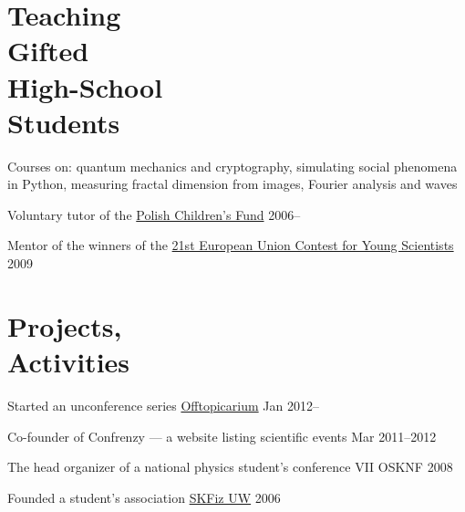 \documentclass[margin,line]{resume}
\begin{document}
\begin{resume}


    \section{\mysidestyle Teaching\\Gifted\\High-School\\Students}
    \begin{list2}
        \item Courses on: quantum mechanics and cryptography, simulating social phenomena in Python, measuring fractal dimension from images, Fourier analysis and waves
        \item Voluntary tutor of the \href{http://www.fundusz.org/?lang=gb}{Polish Children's Fund} \hfill { 2006--}
        \item Mentor of the winners of the \href{http://www.eucys09.fr/}{21st European Union Contest for Young Scientists}\hfill { 2009}
    \end{list2} 

    \section{\mysidestyle Projects,\\Activities}

    \begin{list2}
    \item Started an unconference series \href{http://offtopicarium.wikidot.com/}{Offtopicarium} \hfill { Jan 2012--}
    \item Co-founder of Confrenzy --- a website listing scientific events \hfill { Mar 2011--2012}

    \item The head organizer of a national physics student's conference VII OSKNF \hfill { 2008}
    \item Founded a student's association \href{http://skfiz.fuw.edu.pl/en}{SKFiz UW} \hfill { 2006}
    \end{list2}


\end{resume}
\end{document}
